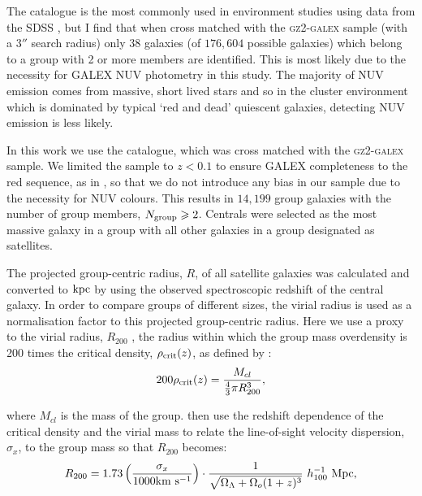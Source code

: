 \documentclass[useAMS,usenatbib]{mn2e}
\begin{document}
The \citeauthor{yang07} catalogue is the most commonly used in environment studies using data from the SDSS \citep[including][]{hoyle11, pasquali12, wetzel14, shankar14, lacerna14, knobel15, fitzpatrick15, lan16, woo16, bluck16, weigel16}, but I find that when cross matched with the \textsc{gz2-galex} sample (with a $3''$ search radius) only $38$ galaxies (of $176,604$ possible galaxies) which belong to a group with 2 or more members are identified. This is most likely due to the necessity for GALEX NUV photometry in this study. The majority of NUV emission comes from massive, short lived stars and so in the cluster environment which is dominated by typical `red and dead' quiescent galaxies, detecting NUV emission is less likely. 

In this work we use the \citet{berlind06} catalogue, which was cross matched with the \textsc{gz2-galex} sample. We limited the sample to $z < 0.1$ to ensure GALEX completeness to the red sequence, as in \citealt{wyder07, yesuf14}, so that we do not introduce any bias in our sample due to the necessity for NUV colours. This results in $14,199$ group galaxies with the number of group members, $N_{\rm{group}} \geq 2$. Centrals were selected as the most massive galaxy in a group \citep[as in][]{yang07, yang09, pasquali10} with all other galaxies in a group designated as satellites.

The projected group-centric radius, $R$, of all satellite galaxies was calculated and converted to $\rm{kpc}$ by using the observed spectroscopic redshift of the central galaxy. In order to compare groups of different sizes, the virial radius is used as a normalisation factor to this projected group-centric radius. Here we use a proxy to the virial radius, $R_{200}$ \citep[see][]{navarro95}, the radius within which the group mass overdensity is 200 times the critical density, $\rho_{\rm{crit}}(z)$, as defined by \citealt{finn05}:
\begin{equation}\label{eq:overdense}
200\rho_{\rm{crit}}(z) = \frac{M_{cl}}{\frac{4}{3}\pi R_{200}^3},
\end{equation}

where $M_{cl}$ is the mass of the group. \citeauthor{finn05} then use the redshift dependence of the critical density and the virial mass to relate the line-of-sight velocity dispersion, $\sigma_x$, to the group mass so that $R_{200}$ becomes:
\begin{equation}\label{eq:r200}
R_{200} = 1.73 \left ( \frac{\sigma_x}{1000 \rm{km}~\rm{s}^{-1}} \right) \cdot \frac{1}{\sqrt{\Omega_{\Lambda} +\Omega_o(1+z)^3}} ~ h_{100}^{-1} ~\rm{Mpc}, 
\end{equation}
\end{document}
